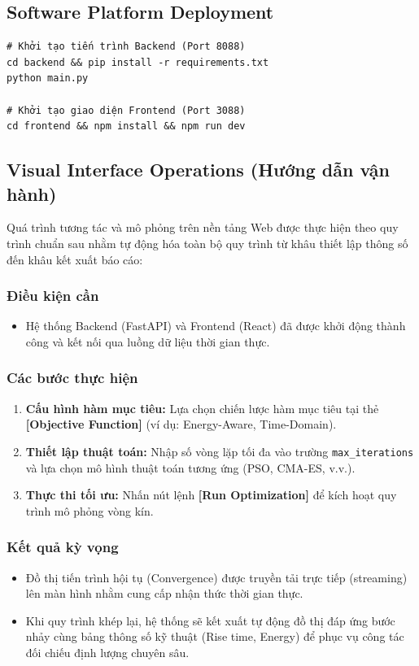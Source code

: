 \documentclass[conference, a4paper]{IEEEtran}
\begin{document}
\subsection{Software Platform Deployment}
\begin{verbatim}
# Khởi tạo tiến trình Backend (Port 8088)
cd backend && pip install -r requirements.txt
python main.py

# Khởi tạo giao diện Frontend (Port 3088)
cd frontend && npm install && npm run dev
\end{verbatim}

\subsection{Visual Interface Operations (Hướng dẫn vận hành)}
Quá trình tương tác và mô phỏng trên nền tảng Web được thực hiện theo quy trình chuẩn sau nhằm tự động hóa toàn bộ quy trình từ khâu thiết lập thông số đến khâu kết xuất báo cáo:

\subsubsection{Điều kiện cần}
\begin{itemize}
    \item Hệ thống Backend (FastAPI) và Frontend (React) đã được khởi động thành công và kết nối qua luồng dữ liệu thời gian thực.
\end{itemize}

\subsubsection{Các bước thực hiện}
\begin{enumerate}
    \item \textbf{Cấu hình hàm mục tiêu:} Lựa chọn chiến lược hàm mục tiêu tại thẻ \textbf{[Objective Function]} (ví dụ: Energy-Aware, Time-Domain).
    \item \textbf{Thiết lập thuật toán:} Nhập số vòng lặp tối đa vào trường \texttt{max\_iterations} và lựa chọn mô hình thuật toán tương ứng (PSO, CMA-ES, v.v.).
    \item \textbf{Thực thi tối ưu:} Nhấn nút lệnh \textbf{[Run Optimization]} để kích hoạt quy trình mô phỏng vòng kín.
\end{enumerate}

\subsubsection{Kết quả kỳ vọng}
\begin{itemize}
    \item Đồ thị tiến trình hội tụ (Convergence) được truyền tải trực tiếp (streaming) lên màn hình nhằm cung cấp nhận thức thời gian thực. 
    \item Khi quy trình khép lại, hệ thống sẽ kết xuất tự động đồ thị đáp ứng bước nhảy cùng bảng thông số kỹ thuật (Rise time, Energy) để phục vụ công tác đối chiếu định lượng chuyên sâu.
\end{itemize}
\end{document}
